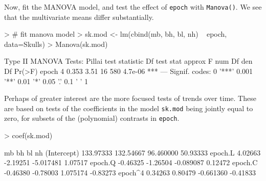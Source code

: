 \documentclass[11pt]{article}
\newcommand{\code}[1]{{\texttt{#1}}}
\newcommand{\func}[1]{{\texttt{#1()}}}
\begin{document}
 
Now, fit the MANOVA model, and test the effect of \code{epoch} with \func{Manova}.
We see that the multivariate means differ substantially.
\begin{Schunk}
\begin{Sinput}
> # fit manova model
> sk.mod <- lm(cbind(mb, bh, bl, nh) ~ epoch, data=Skulls)
> Manova(sk.mod)
\end{Sinput}
\begin{Soutput}
Type II MANOVA Tests: Pillai test statistic
      Df test stat approx F num Df den Df  Pr(>F)    
epoch  4     0.353     3.51     16    580 4.7e-06 ***
---
Signif. codes:  0 '***' 0.001 '**' 0.01 '*' 0.05 '.' 0.1 ' ' 1 
\end{Soutput}
\end{Schunk}
Perhaps of greater interest are the more focused tests of trends over time.
These are based on tests of the coefficients in the model \code{sk.mod}
being jointly equal to zero, for subsets of the 
(polynomial) contrasts in \code{epoch}.
\begin{Schunk}
\begin{Sinput}
> coef(sk.mod)
\end{Sinput}
\begin{Soutput}
                   mb        bh        bl       nh
(Intercept) 133.97333 132.54667 96.460000 50.93333
epoch.L       4.02663  -2.19251 -5.017481  1.07517
epoch.Q      -0.46325  -1.26504 -0.089087  0.12472
epoch.C      -0.46380  -0.78003  1.075174 -0.83273
epoch^4       0.34263   0.80479 -0.661360 -0.41833
\end{Soutput}
\end{Schunk}
\end{document}
